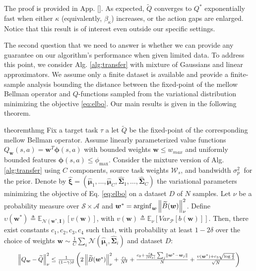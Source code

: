 \documentclass{article}
\newcommand{\arginf}{\operatornamewithlimits{arginf}}
\newcommand{\wt}[1]{\widetilde{#1}}
\newcommand{\wh}[1]{\widehat{#1}}
\newcommand{\norm}[1]{\left\lVert #1 \right\rVert}
\newcommand{\abs}[1]{\left\lvert #1 \right\rvert}
\begin{document}
The proof is provided in App. \ref{}. As expected, $\wt{Q}$ converges to $Q^*$ exponentially fast when either $\kappa$ (equivalently, $\beta_{\kappa}$) increases, or the action gaps are enlarged. Notice that this result is of interest even outside our specific settings.

The second question that we need to answer is whether we can provide any guarantee on our algorithm's performance when given limited data. To address this point, we consider Alg. \ref{alg:transfer} with mixture of Gaussians and linear approximators. We assume only a finite dataset is available and provide a finite-sample analysis bounding the distance between the fixed-point of the mellow Bellman operator and $Q$-functions sampled from the variational distribution minimizing the objective \eqref{eq:elbo}. Our main results is given in the following theorem.

\begin{restatable}{theorem}{thmg} \label{th:main-mixture}
Fix a target task $\tau$ a let $\wt{Q}$ be the fixed-point of the corresponding mellow Bellman operator. Assume linearly parameterized value functions $Q_{\bm{w}}(s,a)=\bm{w}^T\bm{\phi}(s,a)$ with bounded weights $\bm{w}\leq w_{max}$ and uniformly bounded features $\bm{\phi}(s,a)\leq \phi_{\max}$. Consider the mixture version of Alg. \ref{alg:transfer} using $C$ components, source task weights $\mathcal{W}_s$, and bandwidth $\sigma^2_p\ $ for the prior. Denote by $\wh{\bm{\xi}} = (\wh{\bm{\mu}}_1,\dots,\wh{\bm{\mu}}_C,\wh{\bm{\Sigma}}_1,\dots,\wh{\bm{\Sigma}}_C)$ the variational parameters minimizing the objective of Eq. \ref{eq:elbo} on a dataset $D$ of $N$ samples. Let $\nu$ be a probability measure over $\mathcal{S}\times\mathcal{A}$ and $\bm{w}^* = \arginf_{\bm{w}}\norm{\wt{B}(\bm{w})}_{\nu}^2$. Define $\upsilon(\bm{w}^*) \triangleq \mathbb{E}_{\mathcal{N}(\bm{w}^*,\bm{I})}\left[ v(\bm{w}) \right]$, with $v(\bm{w}) \triangleq \mathbb{E}_{\nu}\left[Var_{\mathcal{P}}\left[b(\bm{w})\right]\right]$. Then, there exist constants $c_1,c_2,c_3,c_4$ such that, with probability at least $1-2\delta$ over the choice of weights $\bm{w} \sim \frac{1}{C}\sum_i\mathcal{N}(\wh{\bm{\mu}}_i,\wh{\bm{\Sigma}}_i)$ and dataset $D$:
\begin{equation}
\resizebox{0.93\textwidth}{!}{$
\norm{Q_{\bm{w}} - \wt{Q}}_{\nu}^2 \leq \frac{1}{(1-\gamma)\delta}\left(2\norm{\wt{B}(\bm{w}^{*})}_{\nu}^2 + \frac{c_1}{N^2} + \frac{c_2 + \frac{c_4}{\abs{\mathcal{W}_s}}\sum_{j}\norm{\bm{w}^* - \bm{w}_{j}}}{N} + \frac{\upsilon(\bm{w}^*) + c_3\sqrt{\log\frac{2}{\delta}}}{\sqrt{N}}\right)$}
\end{equation}
\end{restatable}
\end{document}
